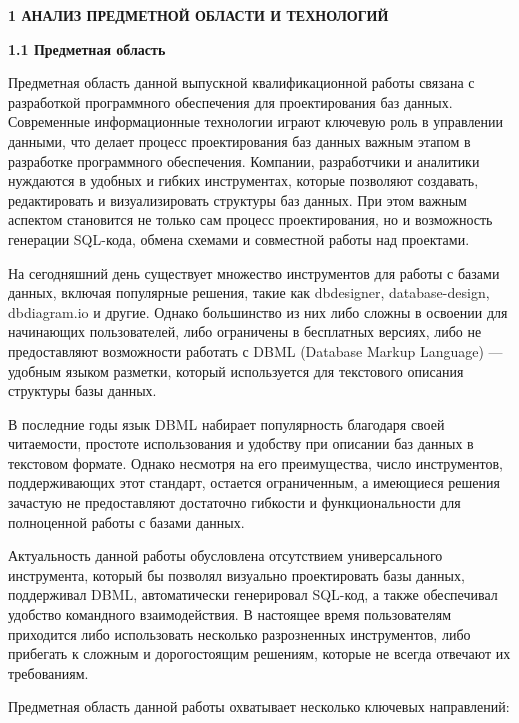 \newpage
\begin{center}
  \textbf{1 АНАЛИЗ ПРЕДМЕТНОЙ ОБЛАСТИ И ТЕХНОЛОГИЙ}
\end{center}


\textbf{1.1 Предметная область}

Предметная область данной выпускной квалификационной работы связана с разработкой программного обеспечения для проектирования баз данных. Современные информационные технологии играют ключевую роль в управлении данными, что делает процесс проектирования баз данных важным этапом в разработке программного обеспечения. Компании, разработчики и аналитики нуждаются в удобных и гибких инструментах, которые позволяют создавать, редактировать и визуализировать структуры баз данных. При этом важным аспектом становится не только сам процесс проектирования, но и возможность генерации SQL-кода, обмена схемами и совместной работы над проектами.
	
На сегодняшний день существует множество инструментов для работы с базами данных, включая популярные решения, такие как dbdesigner, database-design, dbdiagram.io и другие. Однако большинство из них либо сложны в освоении для начинающих пользователей, либо ограничены в бесплатных версиях, либо не предоставляют возможности работать с DBML (Database Markup Language) — удобным языком разметки, который используется для текстового описания структуры базы данных.

В последние годы язык DBML набирает популярность благодаря своей читаемости, простоте использования и удобству при описании баз данных в текстовом формате. Однако несмотря на его преимущества, число инструментов, поддерживающих этот стандарт, остается ограниченным, а имеющиеся решения зачастую не предоставляют достаточно гибкости и функциональности для полноценной работы с базами данных.

Актуальность данной работы обусловлена отсутствием универсального инструмента, который бы позволял визуально проектировать базы данных, поддерживал DBML, автоматически генерировал SQL-код, а также обеспечивал удобство командного взаимодействия. В настоящее время пользователям приходится либо использовать несколько разрозненных инструментов, либо прибегать к сложным и дорогостоящим решениям, которые не всегда отвечают их требованиям.

Предметная область данной работы охватывает несколько ключевых направлений:

